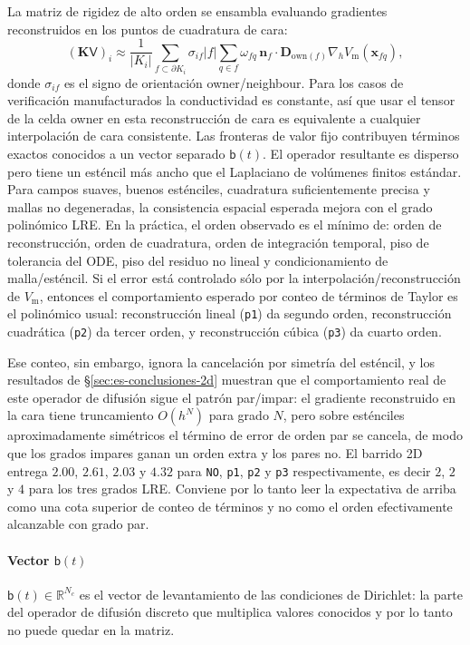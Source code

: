 \documentclass[11pt,a4paper]{article}
\newcommand{\code}[1]{\texttt{\small #1}}
\newcommand{\Vm}{V_{\text{m}}}
\newcommand{\Dten}{\mathbf{D}}
\newcommand{\grad}{\nabla}
\newcommand{\Kstif}{\mathbf{K}}
\newcommand{\R}{\mathbb{R}}
\begin{document}
La matriz de rigidez de alto orden se ensambla evaluando gradientes reconstruidos en los
puntos de cuadratura de cara:
\begin{equation}
  (\Kstif\mathsf{V})_i
  \approx
  \frac{1}{|K_i|}
  \sum_{f\subset\partial K_i}\sigma_{if}
  |f|\sum_{q\in f}\omega_{fq}\,
  \mathbf{n}_f\cdot\Dten_{\mathrm{own}(f)}
  \grad_h \Vm(\mathbf{x}_{fq}),
  \label{eq:ho-face}
\end{equation}
donde $\sigma_{if}$ es el signo de orientación owner/neighbour. Para los casos de
verificación manufacturados la conductividad es constante, así que usar el tensor de la
celda owner en esta reconstrucción de cara es equivalente a cualquier interpolación de cara
consistente. Las fronteras de valor fijo contribuyen términos exactos conocidos a un vector
separado $\mathsf{b}(t)$. El operador resultante es disperso pero tiene un esténcil más
ancho que el Laplaciano de volúmenes finitos estándar. Para campos suaves, buenos
esténciles, cuadratura suficientemente precisa y mallas no degeneradas, la consistencia
espacial esperada mejora con el grado polinómico LRE. En la práctica, el orden observado es
el mínimo de: orden de reconstrucción, orden de cuadratura, orden de integración temporal,
piso de tolerancia del ODE, piso del residuo no lineal y condicionamiento de malla/esténcil.
Si el error está controlado sólo por la interpolación/reconstrucción de $\Vm$, entonces el
comportamiento esperado por conteo de términos de Taylor es el polinómico usual: reconstrucción
lineal (\code{p1}) da segundo orden, reconstrucción cuadrática (\code{p2}) da tercer orden, y
reconstrucción cúbica (\code{p3}) da cuarto orden.

Ese conteo, sin embargo, ignora la cancelación por simetría del esténcil, y los resultados de
\S\ref{sec:es-conclusiones-2d} muestran que el comportamiento real de este operador de difusión
sigue el patrón par/impar: el gradiente reconstruido en la cara tiene truncamiento $O(h^N)$
para grado $N$, pero sobre esténciles aproximadamente simétricos el término de error de orden
par se cancela, de modo que los grados impares ganan un orden extra y los pares no. El barrido
2D entrega $2.00$, $2.61$, $2.03$ y $4.32$ para \code{NO}, \code{p1}, \code{p2} y \code{p3}
respectivamente, es decir $2$, $2$ y $4$ para los tres grados LRE. Conviene por lo tanto leer
la expectativa de arriba como una cota superior de conteo de términos y no como el orden
efectivamente alcanzable con grado par.

\paragraph{Vector $\mathsf{b}(t)$ }
$\mathsf{b}(t)\in\R^{N_c}$ es el vector de levantamiento de las condiciones de Dirichlet: la parte del operador de difusión discreto que multiplica valores conocidos y por lo tanto no puede quedar en la matriz.
\end{document}
